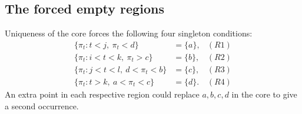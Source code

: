 \documentclass[11pt]{article}
\theoremstyle{remark}\newtheorem{remark}[theorem]{Remark}
\begin{document}
\subsection{The forced empty regions}
Uniqueness of the core forces the following four singleton conditions:
\begin{align}
 \{\pi_t:t<j,\ \pi_t<d\}&=\{a\}, &(R1)\label{u1432:eq:R1}\\
 \{\pi_t:i<t<k,\ \pi_t>c\}&=\{b\}, &(R2)\label{u1432:eq:R2}\\
 \{\pi_t:j<t<l,\ d<\pi_t<b\}&=\{c\}, &(R3)\label{u1432:eq:R3}\\
 \{\pi_t:t>k,\ a<\pi_t<c\}&=\{d\}. &(R4)\label{u1432:eq:R4}
\end{align}
An extra point in each respective region could replace $a,b,c,d$ in the
core to give a second occurrence.
\end{document}
